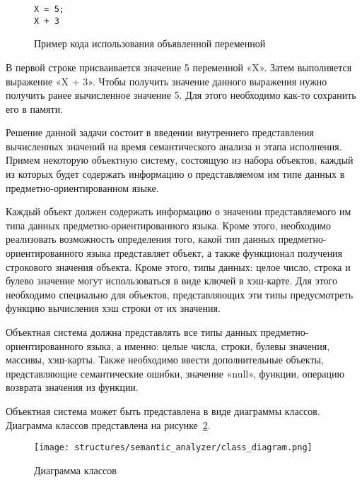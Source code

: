 \begin{figure}[ht]
	\centering
	\vspace{\toppaddingoffigure}
	\begin{lstlisting}
X = 5;
X + 3
\end{lstlisting}
	\caption{Пример кода использования объявленной переменной}
	\label{f:code_example_var}
\end{figure}

В первой строке присваивается значение 5 переменной «X».
Затем выполняется выражение «X + 3».
Чтобы получить значение данного выражения нужно получить ранее вычисленное значение 5.
Для этого необходимо как-то сохранить его в памяти.

Решение данной задачи состоит в введении внутреннего представления вычисленных значений на время семантического анализа и этапа исполнения.
Примем некоторую объектную систему, состоящую из набора объектов, каждый из которых будет содержать информацию о представляемом им типе данных в предметно-ориентированном языке.

Каждый объект должен содержать информацию о значении представляемого им типа данных предметно-ориентированного языка.
Кроме этого, необходимо реализовать возможность определения того, какой тип данных предметно-ориентированного языка представляет объект, а также функционал получения строкового значения объекта.
Кроме этого, типы данных: целое число, строка и булево значение могут использоваться в виде ключей в хэш-карте.
Для этого необходимо специально для объектов, представляющих эти типы предусмотреть функцию вычисления хэш строки от их значения. 

Объектная система должна представлять все типы данных предметно-ориентированного языка, а именно:
целые числа, строки, булевы значения, массивы, хэш-карты.
Также необходимо ввести дополнительные объекты, представляющие семантические ошибки, значение «null», функции, операцию возврата значения из функции.

Объектная система может быть представлена в виде диаграммы классов.
Диаграмма классов представлена на рисунке~\ref{f:class_diagram}.

\clearpage

\begin{figure}[!htp]
	\centering
	\texttt{[image: structures/semantic\_analyzer/class\_diagram.png]}
	\caption{Диаграмма классов}
	\label{f:class_diagram}
\end{figure}

